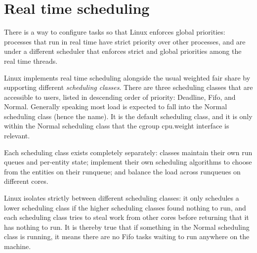 
\chapter{Real time scheduling}

There is a way to configure tasks so that Linux enforces global priorities:
processes that run in real time have strict priority over other processes, and
are under a different scheduler that enforces strict and global priorities among
the real time threads.

Linux implements real time scheduling alongside the usual weighted fair share by
supporting different \textit{scheduling classes}. There are three scheduling
classes that are accessible to users, listed in descending order of priority:
Deadline, Fifo, and Normal. Generally speaking most load is expected to fall
into the Normal scheduling class (hence the name). It is the default scheduling
class, and it is only within the Normal scheduling class that the cgroup
cpu.weight interface is relevant.

Each scheduling class exists completely separately: classes maintain their own
run queues and per-entity state; implement their own scheduling algorithms to
choose from the entities on their runqueue; and balance the load across
runqueues on different cores.

Linux isolates strictly between different scheduling classes: it only schedules
a lower scheduling class if the higher scheduling classes found nothing to run,
and each scheduling class tries to steal work from other cores before returning
that it has nothing to run. It is thereby true that if something in the Normal
scheduling class is running, it means there are no Fifo tasks waiting to run
anywhere on the machine.

